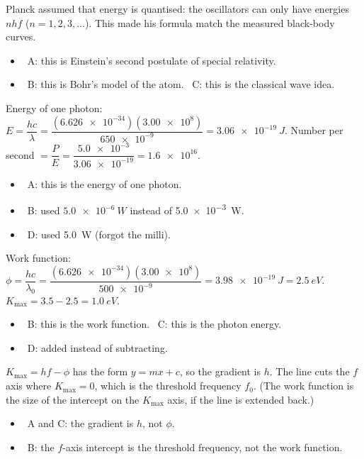 \documentclass[12pt]{article}
\begin{document}
\begin{practiceanswers}
\begin{practiceans}
  Planck assumed that energy is quantised: the oscillators can only have energies $nhf$
  ($n = 1, 2, 3, \dots$). This made his formula match the measured black-body curves.
  \begin{itemize}
    \item \xmark\ A: this is Einstein's second postulate of special relativity.
    \item \xmark\ B: this is Bohr's model of the atom. \quad \xmark\ C: this is the classical wave idea.
  \end{itemize}
\end{practiceans}

\begin{practiceans}
  Energy of one photon: $E = \dfrac{hc}{\lambda} = \dfrac{(\num{6.626e-34})(\num{3.00e8})}{\num{650e-9}}
  = \qty{3.06e-19}{J}$. \quad Number per second $= \dfrac{P}{E} = \dfrac{\num{5.0e-3}}{\num{3.06e-19}}
  = \num{1.6e16}$.
  \begin{itemize}
    \item \xmark\ A: this is the energy of one photon.
    \item \xmark\ B: used $\qty{5.0e-6}{W}$ instead of \qty{5.0e-3}{W}.
    \item \xmark\ D: used \qty{5.0}{W} (forgot the milli).
  \end{itemize}
\end{practiceans}

\begin{practiceans}
  Work function: $\phi = \dfrac{hc}{\lambda_0} = \dfrac{(\num{6.626e-34})(\num{3.00e8})}{\num{500e-9}}
  = \qty{3.98e-19}{J} = \qty{2.5}{eV}$. \quad $K_\mathrm{max} = 3.5 - 2.5 = \qty{1.0}{eV}$.
  \begin{itemize}
    \item \xmark\ B: this is the work function. \quad \xmark\ C: this is the photon energy.
    \item \xmark\ D: added instead of subtracting.
  \end{itemize}
\end{practiceans}

\begin{practiceans}
  $K_\mathrm{max} = hf - \phi$ has the form $y = mx + c$, so the gradient is $h$. The line cuts the $f$
  axis where $K_\mathrm{max} = 0$, which is the threshold frequency $f_0$. (The work function is the size
  of the intercept on the $K_\mathrm{max}$ axis, if the line is extended back.)
  \begin{itemize}
    \item \xmark\ A and C: the gradient is $h$, not $\phi$.
    \item \xmark\ B: the $f$-axis intercept is the threshold frequency, not the work function.
  \end{itemize}
\end{practiceans}


\end{practiceanswers}
\end{document}
